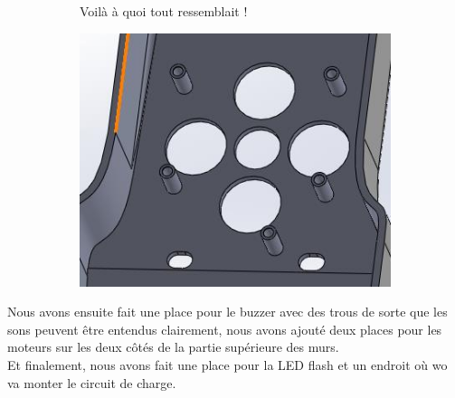 \FloatBarrier

\begin{figure}[!htbp]
    \centering
    \begin{subfigure}[m]{.2\linewidth}
       Voilà à quoi tout ressemblait !
    \end{subfigure}
    \hfill
    \begin{subfigure}{.75\linewidth}
        \centering
        \includegraphics[width=\linewidth]{assets/conception1/img332.jpg}
    \end{subfigure}
\end{figure}

\FloatBarrier

Nous avons ensuite fait une place pour le buzzer avec des trous de sorte que les sons peuvent être entendus clairement, nous avons ajouté deux places pour les moteurs sur les deux côtés de la partie supérieure des murs. \\
Et finalement, nous avons fait une place pour la LED flash et un endroit où wo va monter le circuit de charge. 

